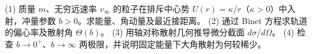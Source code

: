 (1) 质量 \(m\)、无穷远速率 \(v_\infty\) 的粒子在排斥中心势 \(U(r)=\kappa/r\)（\(\kappa>0\)）中入射，冲量参数 \(b>0\)。求能量、角动量及最近接距离。
(2) 通过 Binet 方程求轨道的偏心率及散射角 \(\Theta(b)\)。
(3) 用轴对称散射几何推导微分截面 \(d\sigma/d\Omega\)。
(4) 检查 \(b\to0^+\)、\(b\to\infty\) 两极限，并说明固定能量下大角散射为何较稀少。
